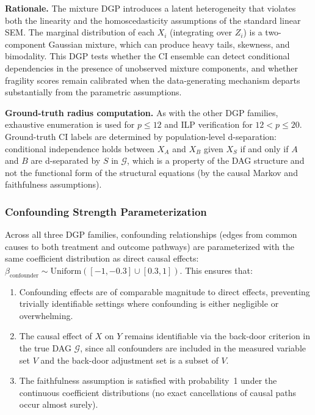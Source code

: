 \documentclass[11pt,a4paper]{article}
\theoremstyle{definition}
\theoremstyle{remark}
\newcommand{\DAG}{\mathcal{G}}
\begin{document}
\noindent\textbf{Rationale.} The mixture DGP introduces a latent
heterogeneity that violates both the linearity and the homoscedasticity
assumptions of the standard linear SEM. The marginal distribution of
each $X_i$ (integrating over $Z_i$) is a two-component Gaussian mixture,
which can produce heavy tails, skewness, and bimodality. This DGP tests
whether the CI ensemble can detect conditional dependencies in the
presence of unobserved mixture components, and whether fragility scores
remain calibrated when the data-generating mechanism departs
substantially from the parametric assumptions.

\noindent\textbf{Ground-truth radius computation.} As with the other
DGP families, exhaustive enumeration is used for $p \leq 12$ and ILP
verification for $12 < p \leq 20$. Ground-truth CI labels are
determined by population-level d-separation: conditional independence
holds between $X_A$ and $X_B$ given $X_S$ if and only if $A$ and $B$
are d-separated by $S$ in $\DAG$, which is a property of the DAG
structure and not the functional form of the structural equations
(by the causal Markov and faithfulness assumptions).

\subsubsection{Confounding Strength Parameterization}

Across all three DGP families, confounding relationships (edges from
common causes to both treatment and outcome pathways) are parameterized
with the same coefficient distribution as direct causal effects:
$\beta_{\mathrm{confounder}} \sim \mathrm{Uniform}([-1, -0.3] \cup
[0.3, 1])$. This ensures that:
\begin{enumerate}[label=(\alph*)]
  \item Confounding effects are of comparable magnitude to direct effects,
    preventing trivially identifiable settings where confounding is either
    negligible or overwhelming.
  \item The causal effect of $X$ on $Y$ remains identifiable via the
    back-door criterion in the true DAG $\DAG$, since all confounders are
    included in the measured variable set $V$ and the back-door adjustment
    set is a subset of $V$.
  \item The faithfulness assumption is satisfied with probability~1 under
    the continuous coefficient distributions (no exact cancellations of
    causal paths occur almost surely).
\end{enumerate}
\end{document}
